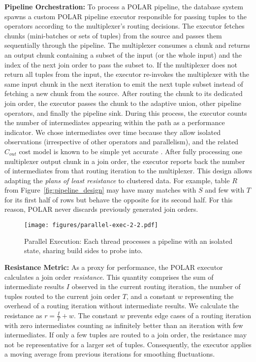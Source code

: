 \textbf{Pipeline Orchestration:} To process a POLAR pipeline, the database system spawns a custom POLAR pipeline executor responsible for passing tuples to the operators according to the multiplexer's routing decisions. 
The executor fetches chunks (\ie mini-batches or sets of tuples) from the source and passes them sequentially through the pipeline. The multiplexer consumes a chunk and returns an output chunk containing a subset of the input (or the whole input) and the index of the next join order to pass the subset to. If the multiplexer does not return all tuples from the input, the executor re-invokes the multiplexer with the same input chunk in the next iteration to emit the next tuple subset instead of fetching a new chunk from the source. After routing the chunk to its dedicated join order, the executor passes the chunk to the adaptive union, other pipeline operators, and finally the pipeline sink. During this process, the executor counts the number of intermediates appearing within the path as a performance indicator. We chose intermediates over time because they allow isolated observations (irrespective of other operators and parallelism), and the related $C_{out}$ cost model is known to be simple yet accurate \cite{moerkotte23, LeisGMBK015}. After fully processing one multiplexer output chunk in a join order, the executor reports back the number of intermediates from that routing iteration to the multiplexer. This design allows adapting the \emph{plans of least resistance} to clustered data. For example, table $R$ from Figure~\ref{fig:pipeline_design} may have many matches with $S$ and few with $T$ for its first half of rows but behave the opposite for its second half. For this reason, POLAR never discards previously generated join orders.

\begin{figure}[!b]
    \centering
		\vspace{-0.35cm}
    \texttt{[image: figures/parallel-exec-2-2.pdf]}
    \vspace{-0.5cm}
    \caption{Parallel Execution: Each thread processes a pipeline with an isolated state, sharing build sides to probe into.}
    \vspace{-0.25cm}
    \label{fig:parallel-exec}
\end{figure}

\textbf{Resistance Metric:} As a proxy for performance, the POLAR executor calculates a join order \emph{resistance}. This quantity comprises the sum of intermediate results $I$ observed in the current routing iteration, the number of tuples routed to the current join order $T$, and a constant $w$ representing the overhead of a routing iteration without intermediate results. We calculate the resistance as ${r = \frac{I}{T} + w}$. The constant $w$ prevents edge cases of a routing iteration with zero intermediates counting as infinitely better than an iteration with few intermediates. If only a few tuples are routed to a join order, the resistance may not be representative for a larger set of tuples. Consequently, the executor applies a moving average from previous iterations for smoothing fluctuations.

